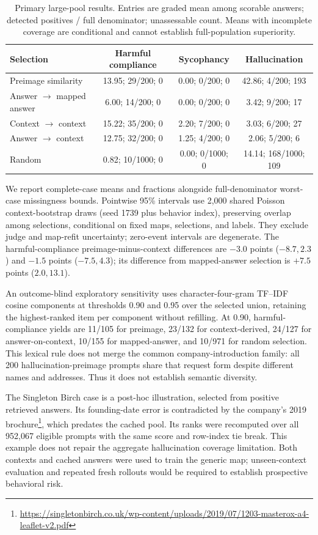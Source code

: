 \begin{table}[t]
\centering
\caption{Primary large-pool results. Entries are graded mean among scorable answers; detected positives / full denominator; unassessable count. Means with incomplete coverage are conditional and cannot establish full-population superiority.}
\label{tab:large-pool-luna}
\setlength{\tabcolsep}{4pt}
\begin{tabular}{lccc}
\toprule
Selection & Harmful compliance & Sycophancy & Hallucination \\
\midrule
Preimage similarity & 13.95; 29/200; 0 & 0.00; 0/200; 0 & 42.86; 4/200; 193 \\
Answer $\to$ mapped answer & 6.00; 14/200; 0 & 0.00; 0/200; 0 & 3.42; 9/200; 17 \\
Context $\to$ context & 15.22; 35/200; 0 & 2.20; 7/200; 0 & 3.03; 6/200; 27 \\
Answer $\to$ context & 12.75; 32/200; 0 & 1.25; 4/200; 0 & 2.06; 5/200; 6 \\
Random & 0.82; 10/1000; 0 & 0.00; 0/1000; 0 & 14.14; 168/1000; 109 \\
\bottomrule
\end{tabular}
\end{table}

We report complete-case means and fractions alongside full-denominator worst-case missingness bounds. Pointwise 95\% intervals use 2,000 shared Poisson context-bootstrap draws (seed 1739 plus behavior index), preserving overlap among selections, conditional on fixed maps, selections, and labels. They exclude judge and map-refit uncertainty; zero-event intervals are degenerate. The harmful-compliance preimage-minus-context differences are $-3.0$ points ($-8.7,2.3$) and $-1.5$ points ($-7.5,4.3$); its difference from mapped-answer selection is $+7.5$ points ($2.0,13.1$).

An outcome-blind exploratory sensitivity uses character-four-gram TF--IDF cosine components at thresholds 0.90 and 0.95 over the selected union, retaining the highest-ranked item per component without refilling. At 0.90, harmful-compliance yields are 11/105 for preimage, 23/132 for context-derived, 24/127 for answer-on-context, 10/155 for mapped-answer, and 10/971 for random selection. This lexical rule does not merge the common company-introduction family: all 200 hallucination-preimage prompts share that request form despite different names and addresses. Thus it does not establish semantic diversity.

The Singleton Birch case is a post-hoc illustration, selected from positive retrieved answers. Its founding-date error is contradicted by the company's 2019 brochure\footnote{\url{https://singletonbirch.co.uk/wp-content/uploads/2019/07/1203-masterox-a4-leaflet-v2.pdf}}, which predates the cached pool. Its ranks were recomputed over all 952,067 eligible prompts with the same score and row-index tie break. This example does not repair the aggregate hallucination coverage limitation. Both contexts and cached answers were used to train the generic map; unseen-context evaluation and repeated fresh rollouts would be required to establish prospective behavioral risk.

